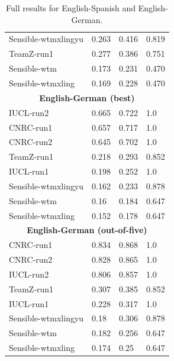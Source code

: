 \begin{table}[bt]
{\begin{tabular}{|l|lll|}
Sensible-wtmxlingyu & 0.263    & 0.416         & 0.819\\
TeamZ-run1          & 0.277    & 0.386         & 0.751\\
Sensible-wtm        & 0.173    & 0.231         & 0.470 \\
Sensible-wtmxling   & 0.169    & 0.228         & 0.470 \\
\hline
\multicolumn{4}{|c|}{\textbf{English-German (best)}} \\
\hline
 IUCL-run2           & 0.665    & 0.722         & 1.0                 \\
 CNRC-run1           & 0.657    & 0.717         & 1.0                 \\
CNRC-run2           & 0.645    & 0.702         & 1.0                 \\
TeamZ-run1          & 0.218    & 0.293         & 0.852 \\
IUCL-run1           & 0.198    & 0.252         & 1.0                 \\
Sensible-wtmxlingyu & 0.162    & 0.233         & 0.878\\
Sensible-wtm        & 0.16     & 0.184         & 0.647\\
Sensible-wtmxling   & 0.152    & 0.178         & 0.647\\
\hline
\multicolumn{4}{|c|}{\textbf{English-German (out-of-five)}} \\
\hline
CNRC-run1           & 0.834    & 0.868         & 1.0                 \\
CNRC-run2           & 0.828    & 0.865         & 1.0                 \\
IUCL-run2           & 0.806    & 0.857         & 1.0                 \\
TeamZ-run1          & 0.307    & 0.385         & 0.852\\
IUCL-run1           & 0.228    & 0.317         & 1.0                 \\
Sensible-wtmxlingyu & 0.18     & 0.306         & 0.878\\
Sensible-wtm        & 0.182    & 0.256         & 0.647\\
Sensible-wtmxling   & 0.174    & 0.25          & 0.647\\
\hline
\end{tabular}
\caption{Full results for English-Spanish and English-German.}
\label{tab:fullresults1}
}
\end{table}



